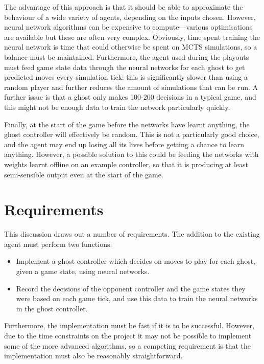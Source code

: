The advantage of this approach is that it should be able to approximate the behaviour of a wide variety of agents, depending on the inputs chosen.  However, neural network algorithms can be expensive to compute---various optimisations are available but these are often very complex.  Obviously, time spent training the neural network is time that could otherwise be spent on MCTS simulations, so a balance must be maintained.  Furthermore, the agent used during the playouts must feed game state data through the neural networks for each ghost to get predicted moves every simulation tick: this is significantly slower than using a random player and further reduces the amount of simulations that can be run.  A further issue is that a ghost only makes 100-200 decisions in a typical game, and this might not be enough data to train the network particularly quickly.

Finally, at the start of the game before the networks have learnt anything, the ghost controller will effectively be random.  This is not a particularly good choice, and the agent may end up losing all its lives before getting a chance to learn anything.  However, a possible solution to this could be feeding the networks with weights learnt offline on an example controller, so that it is producing at least semi-sensible output even at the start of the game.

\section{Requirements}

This discussion draws out a number of requirements.  The addition to the existing agent must perform two functions:

\begin{itemize}
\item Implement a ghost controller which decides on moves to play for each ghost, given a game state, using neural networks.
\item Record the decisions of the opponent controller and the game states they were based on each game tick, and use this data to train the neural networks in the ghost controller.
\end{itemize}

Furthermore, the implementation must be fast if it is to be successful.  However, due to the time constraints on the project it may not be possible to implement some of the more advanced algorithms, so a competing requirement is that the implementation must also be reasonably straightforward.

